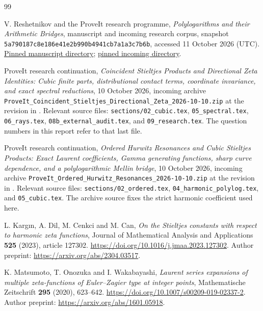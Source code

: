 \documentclass[11pt]{article}
\numberwithin{equation}{section}
\theoremstyle{definition}
\theoremstyle{remark}
\newcommand{\sourcecommit}{\texttt{5a790187c8e186e41e2b990b4941cb7a1a3c7b6b}}
\begin{document}
\begin{thebibliography}{99}
\raggedright
{}

V. Reshetnikov and the ProveIt research programme,
\emph{Polylogarithms and their Arithmetic Bridges}, manuscript and
incoming research corpus, snapshot \sourcecommit, accessed
11 October 2026 (UTC).
\href{https://github.com/VladimirReshetnikov/ProveIt/tree/5a790187c8e186e41e2b990b4941cb7a1a3c7b6b/Analysis/Polylogarithms/docs/manuscript}{Pinned manuscript directory};
\href{https://github.com/VladimirReshetnikov/ProveIt/tree/5a790187c8e186e41e2b990b4941cb7a1a3c7b6b/docs/incoming}{pinned incoming directory}.

ProveIt research continuation,
\emph{Coincident Stieltjes Products and Directional Zeta Identities:
Cubic finite parts, distributional contact terms, coordinate
invariance, and exact spectral reductions},
10 October 2026, incoming archive
\texttt{ProveIt\_Coincident\_Stieltjes\_Directional\_Zeta\_2026-10-10.zip}
at the revision in \cite{Repo}.
Relevant source files: \texttt{sections/02\_cubic.tex},
\texttt{05\_spectral.tex}, \texttt{06\_rays.tex},
\texttt{08b\_external\_audit.tex}, and \texttt{09\_research.tex}.
The question numbers in this report refer to that last file.

ProveIt research continuation,
\emph{Ordered Hurwitz Resonances and Cubic Stieltjes Products:
Exact Laurent coefficients, Gamma generating functions, sharp curve
dependence, and a polylogarithmic Mellin bridge},
10 October 2026, incoming archive
\texttt{ProveIt\_Ordered\_Hurwitz\_Resonances\_2026-10-10.zip}
at the revision in \cite{Repo}.
Relevant source files: \texttt{sections/02\_ordered.tex},
\texttt{04\_harmonic\_polylog.tex}, and \texttt{05\_cubic.tex}.
The archive source fixes the strict harmonic coefficient used here.

L. Karg\i n, A. Dil, M. Cenkci and M. Can,
\emph{On the Stieltjes constants with respect to harmonic zeta
functions}, Journal of Mathematical Analysis and Applications
\textbf{525} (2023), article 127302.
\url{https://doi.org/10.1016/j.jmaa.2023.127302}.
Author preprint: \url{https://arxiv.org/abs/2304.03517}.

K. Matsumoto, T. Onozuka and I. Wakabayashi,
\emph{Laurent series expansions of multiple zeta-functions of
Euler--Zagier type at integer points}, Mathematische Zeitschrift
\textbf{295} (2020), 623--642.
\url{https://doi.org/10.1007/s00209-019-02337-2}.
Author preprint: \url{https://arxiv.org/abs/1601.05918}.


\end{thebibliography}
\end{document}
